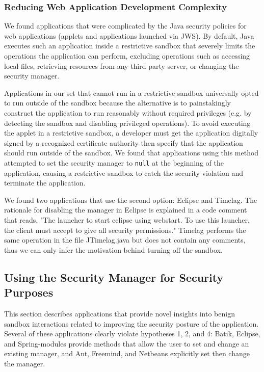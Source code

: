 \documentclass{sig-alternate}
\begin{document}
\subsubsection{Reducing Web Application Development Complexity}\label{sub:Reducing-Web-Application-Complexity}

We found applications that were complicated by the Java security policies
for web applications (applets and applications launched via JWS). By default, Java executes such an application inside a restrictive
sandbox that severely limits the operations the application can perform,
excluding operations such as accessing local files, retrieving resources
from any third party server, or changing the security manager. 

Applications in our set that cannot run in a restrictive sandbox universally opted to run outside of the sandbox because the alternative is to painstakingly construct the application to run reasonably without required privileges (e.g. by detecting the sandbox and disabling privileged operations). To avoid executing the applet in a restrictive
sandbox, a developer must get the application digitally signed
by a recognized certificate authority then specify that the application should
run outside of the sandbox. We found that applications using this method attempted
to set the security manager to \texttt{null} at the beginning of the
application, causing a restrictive sandbox to catch the security violation and
terminate the application. 

We found two applications that use the second option: Eclipse and
Timelag. The rationale for disabling the manager in Eclipse is explained in a code comment that reads, "The launcher to start eclipse using webstart. To use this launcher, the client must accept to give all security permissions." Timelag performs the same operation in the file JTimelag.java but does not contain any comments, thus we can only infer the motivation behind turning off the sandbox.

\subsection{Using the Security Manager for Security Purposes}\label{sub:Using-the-Security}

This section describes applications that provide novel insights into benign sandbox interactions related to improving the security
posture of the application. Several of these applications clearly violate hypotheses 1, 2, and 4: Batik, Eclipse, and Spring-modules provide
methods that allow the user to set and change an existing manager,
and Ant, Freemind, and Netbeans explicitly set then change the manager.
\end{document}
